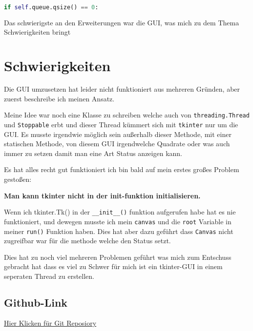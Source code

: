 \begin{lstlisting}[language=Python]
if self.queue.qsize() == 0:
\end{lstlisting}


Das schwierigste an den Erweiterungen war die GUI, was mich zu dem Thema Schwierigkeiten bringt

\section{Schwierigkeiten}
Die GUI umzusetzen hat leider nicht funktioniert aus mehreren Gründen, aber zuerst beschreibe ich meinen Ansatz.

Meine Idee war noch eine Klasse zu schreiben welche auch von \verb|threading.Thread| und \verb|Stoppable| erbt und dieser Thread kümmert sich mit \verb|tkinter| nur um die GUI. Es musste irgendwie möglich sein außerhalb dieser Methode, mit einer statischen Methode, von diesem GUI irgendwelche Quadrate oder was auch immer zu setzen damit man eine Art Status anzeigen kann.

Es hat alles recht gut funktioniert ich bin bald auf mein erstes großes Problem gestoßen: 

\textbf{Man kann tkinter nicht in der init-funktion initialisieren.}

Wenn ich tkinter.Tk() in der \verb|__init__()| funktion aufgerufen habe hat es nie funktioniert, und dewegen musste ich mein \verb|canvas| und die \verb|root| Variable in meiner \verb|run()| Funktion haben. Dies hat aber dazu geführt dass \verb|Canvas| nicht zugreifbar war für die methode welche den Status setzt. 

Dies hat zu noch viel mehreren Problemen geführt was mich zum Entschuss gebracht hat dass es viel zu Schwer für mich ist ein tkinter-GUI in einem seperaten Thread zu erstellen.

\subsection{Github-Link}

\hyperlink{https://github.com/mwoelfer-tgm/sew1617/tree/master/thread_watchdog}{Hier Klicken für Git Reposiory}